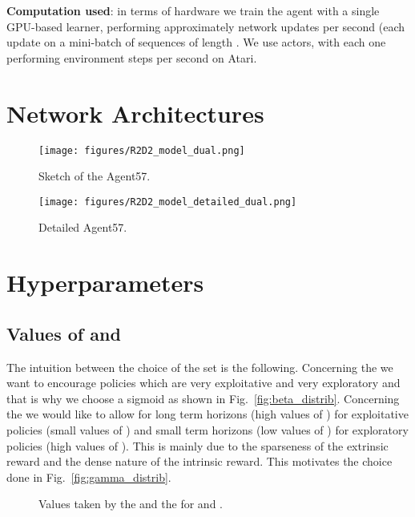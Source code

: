 \documentclass{article}
\begin{document}
\textbf{Computation used}: in terms of hardware we train the agent with a single GPU-based learner, performing approximately  network updates per second (each update on a mini-batch of  sequences of length . We use  actors, with each one performing  environment steps per second on Atari. \clearpage
\section{Network Architectures}
\label{app:neural}

\begin{figure}[!ht]
    \centering
    \texttt{[image: figures/R2D2\_model\_dual.png]}
    \caption{Sketch of the Agent57.} 
    \label{fig:spectrumarchitecture.}
\end{figure}

\begin{figure}[!ht]
    \centering
    \texttt{[image: figures/R2D2\_model\_detailed\_dual.png]}
    \caption{Detailed Agent57.} 
    \label{fig:detailedspectrumarchitecture.}
\end{figure} \clearpage
\section{Hyperparameters}

\subsection{Values of  and }
\label{app:family}
The intuition between the choice of the set  is the following. Concerning the  we want to encourage policies which are very exploitative and very exploratory and that is why we choose a sigmoid as shown in Fig.~\ref{fig:beta_distrib}. Concerning the  we would like to allow for long term horizons (high values of ) for exploitative policies (small values of ) and small term horizons (low values of ) for exploratory policies (high values of ). This is mainly due to the sparseness of the extrinsic reward and the dense nature of the intrinsic reward. This motivates the choice done in Fig.~\ref{fig:gamma_distrib}.   

\begin{figure}[h]
\label{app:graphs}
    \centering
    \caption{Values taken by the  and the  for  and .} 
\end{figure}
\end{document}
